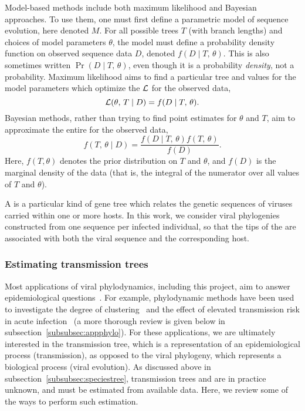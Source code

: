 Model-based methods include both maximum likelihood and Bayesian approaches. To
use them, one must first define a parametric model of sequence evolution, here
denoted $M$. For all possible trees $T$ (with branch lengths) and choices of
model parameters $\theta$, the model must define a probability density function
on observed sequence data $D$, denoted $f(D \mid T,\,\theta)$. This is also
sometimes written $\Pr(D \mid T,\,\theta)$, even though it is a probability
\emph{density}, not a probability. Maximum likelihood aims to find a particular
tree and values for the model parameters which optimize the  $\mathcal{L}$ for the observed data,
\[
  \mathcal{L}(\theta,\, T \mid D) = f(D \mid T,\, \theta).
\]
Bayesian methods, rather than trying to find point estimates for $\theta$ and
$T$, aim to approximate the entire  for the
observed data,
\[
  f(T,\,\theta \mid D) = \frac{f(D \mid T,\,\theta)f(T,\,\theta)}{f(D)}.
\]
Here, $f(T, \theta)$ denotes the prior distribution on $T$ and $\theta$, and
$f(D)$ is the marginal density of the data (that is, the integral of the
numerator over all values of $T$ and $\theta$).

A  is a particular kind of gene tree which relates the
genetic sequences of viruses carried within one or more hosts. In this work, we
consider viral phylogenies constructed from one sequence per infected
individual, so that the tips of the are associated with both the viral sequence
and the corresponding host.

\subsubsection{Estimating transmission trees}
\label{subsubsec:treeconv}

Most applications of viral phylodynamics, including this project, aim to answer
epidemiological questions~\autocite{volz2013viral}. For example, phylodynamic
methods have been used to investigate the degree of
clustering~\autocite{hughes2009molecular} and the effect of elevated
transmission risk in acute infection~\autocite{volz2012simple} (a more thorough
review is given below in subsection~\ref{subsubsec:appphylo}). For these
applications, we are ultimately interested in the transmission tree, which is a
representation of an epidemiological process (transmission), as opposed to the
viral phylogeny, which represents a biological process (viral evolution). As
discussed above in subsection~\ref{subsubsec:speciestree}, transmission trees and
are in practice unknown, and must be estimated from available data. Here, we
review some of the ways to perform such estimation.

